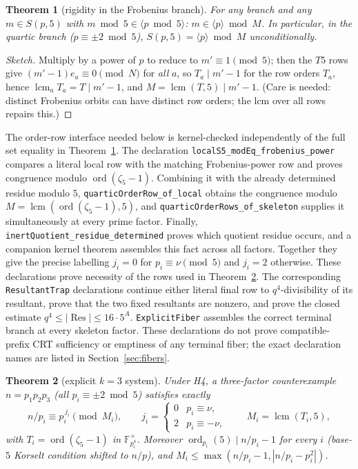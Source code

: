 \documentclass[11pt]{amsart}
\newtheorem{theorem}{Theorem}[section]
\theoremstyle{definition}
\theoremstyle{remark}
\newcommand{\F}{\mathbb{F}}
\newcommand{\ord}{\operatorname{ord}}
\newcommand{\lcm}{\operatorname{lcm}}
\begin{document}
\begin{theorem}[rigidity in the Frobenius branch]\label{thm:rigidity}
For any branch and any $m \in S(p,5)$ with $m \bmod 5 \in
\langle p \bmod 5\rangle$: $m \in \langle p \rangle \bmod M$. In
particular, in the quartic branch ($p \equiv \pm2 \bmod 5$),
$S(p,5) = \langle p \rangle \bmod M$ unconditionally.
\end{theorem}

\begin{proof}[Sketch]
Multiply by a power of $p$ to reduce to $m' \equiv 1 \pmod 5$; then the $T5$
rows give $(m'-1)e_a \equiv 0 \pmod N$ for \emph{all} $a$, so
$T_a \mid m' - 1$ for the row orders $T_a$, hence
$\lcm_a T_a = T \mid m'-1$, and $M = \lcm(T,5) \mid m'-1$. (Care is needed:
distinct Frobenius orbits can have distinct row orders; the lcm over all
rows repairs this.)
\end{proof}

The order-row interface needed below is kernel-checked independently of the
full set equality in Theorem~\ref{thm:rigidity}.
The declaration \texttt{localS5\_modEq\_frobenius\_power} compares a literal
local row with the matching Frobenius-power row and proves congruence modulo
$\operatorname{ord}(\zeta_5-1)$.  Combining it with the already determined
residue modulo $5$, \texttt{quarticOrderRow\_of\_local} obtains the
congruence modulo $M=\operatorname{lcm}(\operatorname{ord}(\zeta_5-1),5)$,
and \texttt{quarticOrderRows\_of\_skeleton} supplies it simultaneously at
every prime factor.  Finally,
{\small\texttt{inertQuotient\_residue\_determined}} proves which quotient
residue occurs, and a companion kernel theorem assembles this fact across
all factors.  Together they give the precise labelling $j_i=0$ for
$p_i\equiv\nu\pmod5$ and $j_i=2$ otherwise.  These declarations prove
necessity of the rows used in Theorem~\ref{thm:k3}.  The corresponding
\texttt{ResultantTrap} declarations continue either literal final row to
\(q^4\)-divisibility of its resultant, prove that the two fixed resultants
are nonzero, and prove the closed estimate
\(q^4\le|\operatorname{Res}|\le16\cdot5^A\).
\texttt{ExplicitFiber} assembles the correct terminal branch at every
skeleton factor.  These declarations do not prove compatible-prefix CRT
sufficiency or emptiness of any terminal fiber; the exact declaration names
are listed in Section~\ref{sec:fibers}.

\begin{theorem}[explicit $k=3$ system]\label{thm:k3}
Under H4, a three-factor counterexample $n = p_1p_2p_3$ (all
$p_i \equiv \pm2 \bmod 5$) satisfies exactly
\[
n/p_i \equiv p_i^{\,j_i} \pmod{M_i},
\qquad
j_i = \begin{cases} 0 & p_i \equiv \nu,\\ 2 & p_i \equiv -\nu,\end{cases}
\qquad M_i = \lcm(T_i, 5),
\]
with $T_i = \ord(\zeta_5 - 1)$ in $\F_{p_i^4}^\times$. Moreover
$\ord_{p_i}(5) \mid n/p_i - 1$ for every $i$ (base-$5$ Korselt condition
shifted to $n/p$), and $M_i \le \max(n/p_i - 1, |n/p_i - p_i^2|)$.
\end{theorem}
\end{document}
